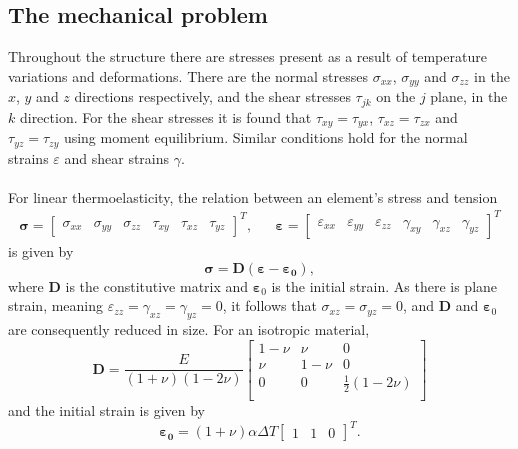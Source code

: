 \documentclass[a4paper,11pt]{article}
\begin{document}
\subsection{The mechanical problem}
Throughout the structure there are stresses present as a result of temperature variations and deformations. There are the normal stresses $\sigma_{xx}$, $\sigma_{yy}$ and $\sigma_{zz}$ in the $x$, $y$ and $z$ directions respectively, and the shear stresses $\tau_{jk}$ on the $j$ plane, in the $k$ direction. For the shear stresses it is found that $\tau_{xy}=\tau_{yx}$, $\tau_{xz}=\tau_{zx}$ and $\tau_{yz}=\tau_{zy}$ using moment equilibrium. Similar conditions hold for the normal strains $\varepsilon$ and shear strains $\gamma$.\\
\\For linear thermoelasticity, the relation between an element's stress and tension 
\begin{align*}
    \boldsymbol{\sigma} = \begin{bmatrix}
    \sigma_{xx}&
    \sigma_{yy}&
    \sigma_{zz}&
    \tau_{xy}&
    \tau_{xz}&
    \tau_{yz}
    \end{bmatrix}^T,&
    &\boldsymbol{\varepsilon} =
    \begin{bmatrix}
    \varepsilon_{xx}&
    \varepsilon_{yy}&
    \varepsilon_{zz}&
    \gamma_{xy}&
    \gamma_{xz}&
    \gamma_{yz}
    \end{bmatrix}^T
\end{align*}
is given by 
\begin{equation} \label{eq:sigeps}
    \boldsymbol{\sigma} = \boldsymbol{D (\varepsilon - \varepsilon_0)},
\end{equation}
where $\boldsymbol{D}$ is the constitutive matrix and $\boldsymbol{\varepsilon}_0$ is the initial strain. As there is plane strain, meaning $\varepsilon_{zz}=\gamma_{xz}=\gamma_{yz}=0$, it follows that $\sigma_{xz}=\sigma_{yz}=0$, and $\boldsymbol D$ and $\boldsymbol{\varepsilon}_0$ are consequently reduced in size. For an isotropic material, 
\begin{equation} \label{eq:D}
    \boldsymbol{D} = \frac{E}{(1+\nu)(1-2\nu)}\begin{bmatrix}
    1-\nu & \nu & 0 \\
    \nu & 1-\nu & 0\\
    0 & 0 & \frac{1}{2}(1-2\nu)\\
    \end{bmatrix}
\end{equation}
and the initial strain is given by
\begin{equation} \label{eq:epsilon02}
    \boldsymbol{\varepsilon_0} = (1+\nu)\alpha \Delta T \begin{bmatrix}
    1 & 1 & 0
    \end{bmatrix}^T.
\end{equation} 
\end{document}

